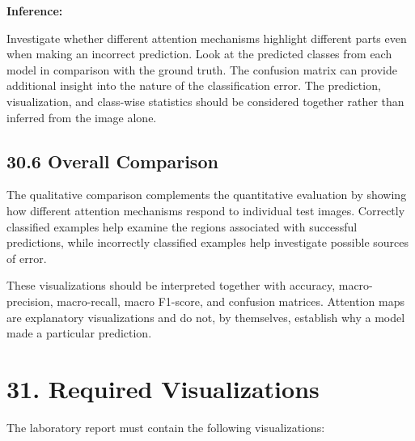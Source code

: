 \documentclass[10pt]{article}
\begin{document}
\noindent\textbf{Inference:}

Investigate whether different attention mechanisms highlight different parts even when making an incorrect prediction. Look at the predicted classes from each model in comparison with the ground truth. The confusion matrix can provide additional insight into the nature of the classification error. The prediction, visualization, and class-wise statistics should be considered together rather than inferred from the image alone.

\subsection*{30.6 Overall Comparison}

The qualitative comparison complements the quantitative evaluation
by showing how different attention mechanisms respond to individual
test images. Correctly classified examples help examine the regions
associated with successful predictions, while incorrectly classified
examples help investigate possible sources of error.

These visualizations should be interpreted together with accuracy,
macro-precision, macro-recall, macro F1-score, and confusion matrices.
Attention maps are explanatory visualizations and do not, by
themselves, establish why a model made a particular prediction.
\section*{31. Required Visualizations}

The laboratory report must contain the following visualizations:
\end{document}
